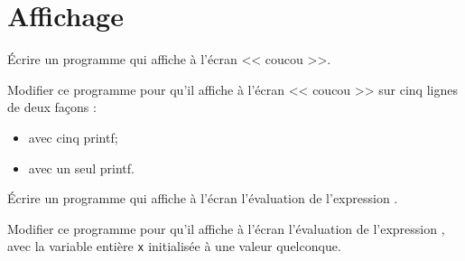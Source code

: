 
\renewcommand{\labelitemi}{$\bullet$}

\newcommand{\commentaire}[1]{}


\newcommand{\TPshortName}{TP3}



\section{Affichage}

\begin{newenu}
\item Écrire un programme  qui affiche à l'écran << coucou >>.
\item Modifier ce programme pour qu'il affiche à l'écran << coucou >> sur cinq lignes de deux façons :
  \begin{itemize}
  \item avec cinq printf;
  \item avec un seul printf.
  \end{itemize}
\item Écrire un programme   qui affiche à l'écran l'évaluation de l'expression .
\item Modifier ce programme pour qu'il affiche à l'écran l'évaluation
  de l'expression , avec la variable entière \verb|x|
  initialisée à une valeur quelconque.
\end{newenu}

